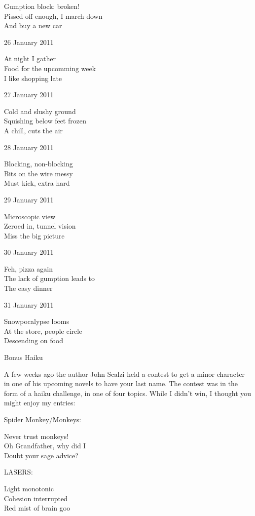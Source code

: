 \documentclass[12pt]{article}
\begin{document}
Gumption block: broken! \\
Pissed off enough, I march down \\
And buy a new car

26 January 2011

At night I gather \\
Food for the upcomming week \\
I like shopping late

27 January 2011

Cold and slushy ground \\
Squishing below feet frozen \\
A chill, cuts the air

28 January 2011

Blocking, non-blocking \\
Bits on the wire messy \\
Must kick, extra hard

29 January 2011

Microscopic view \\
Zeroed in, tunnel vision \\
Miss the big picture

30 January 2011

Feh, pizza again \\
The lack of gumption leads to \\
The easy dinner

31 January 2011

Snowpocalypse looms \\
At the store, people circle \\
Descending on food


\newpage

\begin{center}
\Large{Bonus Haiku}
\end{center}

A few weeks ago the author John Scalzi held a contest to get a minor
character in one of his upcoming novels to have your last name. The
contest was in the form of a haiku challenge, in one of four topics.
While I didn't win, I thought you might enjoy my entries:

Spider Monkey/Monkeys:

Never trust monkeys! \\
Oh Grandfather, why did I \\
Doubt your sage advice?

LASERS:

Light monotonic \\
Cohesion interrupted \\
Red mist of brain goo
\end{document}
